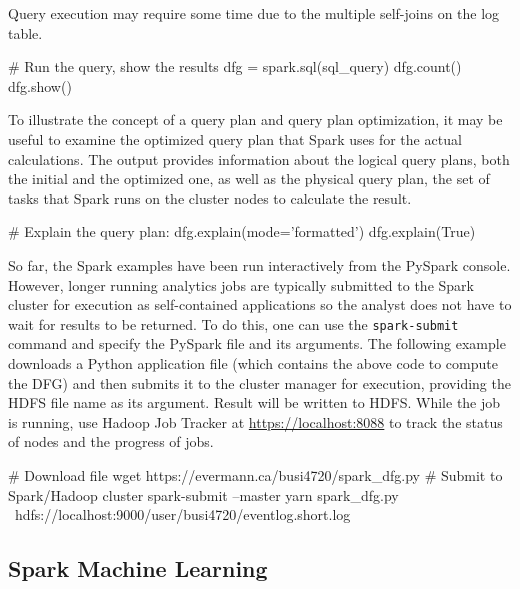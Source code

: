 Query execution may require some time due to the multiple self-joins on the log table. 

\begin{samepage}
\begin{pythoncode}
# Run the query, show the results
dfg = spark.sql(sql_query)
dfg.count()
dfg.show()
\end{pythoncode}
\end{samepage}

To illustrate the concept of a query plan and query plan optimization, it may be useful to examine the optimized query plan that Spark uses for the actual calculations. The output provides information about the logical query plans, both the initial and the optimized one, as well as the physical query plan, the set of tasks that Spark runs on the cluster nodes to calculate the result.

\begin{samepage}
\begin{pythoncode}
# Explain the query plan:
dfg.explain(mode='formatted')
dfg.explain(True)
\end{pythoncode}
\end{samepage}

So far, the Spark examples have been run interactively from the PySpark console. However, longer running analytics jobs are typically submitted to the Spark cluster for execution as self-contained applications so the analyst does not have to wait for results to be returned. To do this, one can use the \texttt{spark-submit} command and specify the PySpark file and its arguments. The following example downloads a Python application file (which contains the above code to compute the DFG) and then submits it to the cluster manager for execution, providing the HDFS file name as its argument. Result will be written to HDFS. While the job is running, use Hadoop Job Tracker at \url{https://localhost:8088} to track the status of nodes and the progress of jobs.

\begin{samepage}
\begin{bashcode}
# Download file
wget https://evermann.ca/busi4720/spark_dfg.py
# Submit to Spark/Hadoop cluster
spark-submit --master yarn spark_dfg.py \
 hdfs://localhost:9000/user/busi4720/eventlog.short.log
\end{bashcode}
\end{samepage}

\subsection{Spark Machine Learning}


